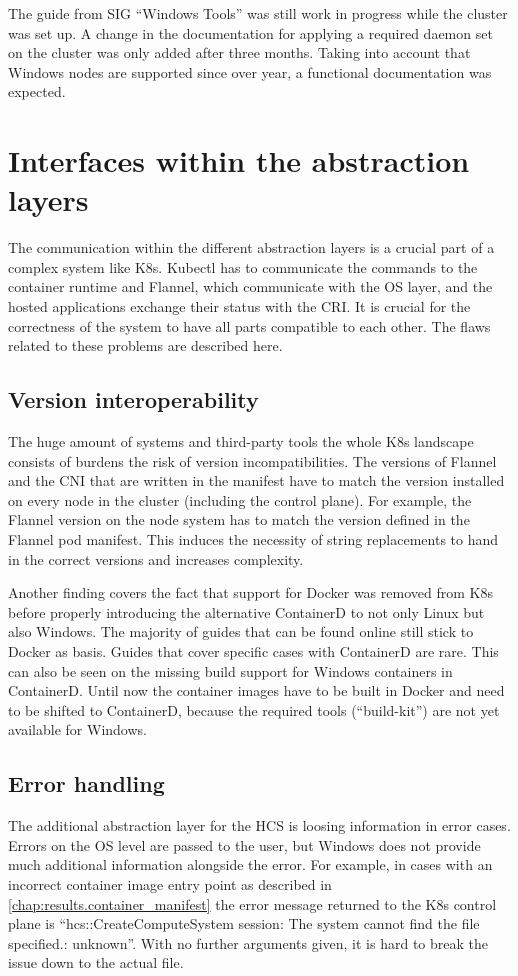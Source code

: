 The guide from \ac{SIG} \enquote{Windows Tools} was still work in progress while the cluster was set up. A change in the documentation for applying a required daemon set on the cluster was only added after three months. Taking into account that Windows nodes are supported since over year, a functional documentation was expected.

\section{Interfaces within the abstraction layers}
The communication within the different abstraction layers is a crucial part of a complex system like \ac{K8s}. Kubectl has to communicate the commands to the container runtime and Flannel, which communicate with the \ac{OS} layer, and the hosted applications exchange their status with the \ac{CRI}. 
It is crucial for the correctness of the system to have all parts compatible to each other. The flaws related to these problems are described here. 

\subsection{Version interoperability}
The huge amount of systems and third-party tools the whole \ac{K8s} landscape consists of burdens the risk of version incompatibilities. 
The versions of Flannel and the \ac{CNI} that are written in the manifest have to match the version installed on every node in the cluster (including the control plane). For example, the Flannel version on the node system has to match the version defined in the Flannel pod manifest. This induces the necessity of string replacements to hand in the correct versions and increases complexity.

Another finding covers the fact that support for Docker was removed from \ac{K8s} before properly introducing the alternative ContainerD to not only Linux but also \ac{Windows}. The majority of guides that can be found online still stick to Docker as basis. Guides that cover specific cases with ContainerD are rare.
This can also be seen on the missing build support for \ac{Windows} containers in ContainerD. Until now the container images have to be built in Docker and need to be shifted to ContainerD, because the required tools (\enquote{build-kit}) are not yet available for \ac{Windows}\cite{Microsoft.20221225}.

\subsection{Error handling}
The additional abstraction layer for the \ac{HCS} is loosing information in error cases. Errors on the \ac{OS} level are passed to the user, but \ac{Windows} does not provide much additional information alongside the error. For example, in cases with an incorrect container image entry point as described in \autoref{chap:results.container_manifest} the error message returned to the \ac{K8s} control plane is \enquote{hcs::CreateComputeSystem session: The system cannot find the file specified.: unknown}. With no further arguments given, it is hard to break the issue down to the actual file.

